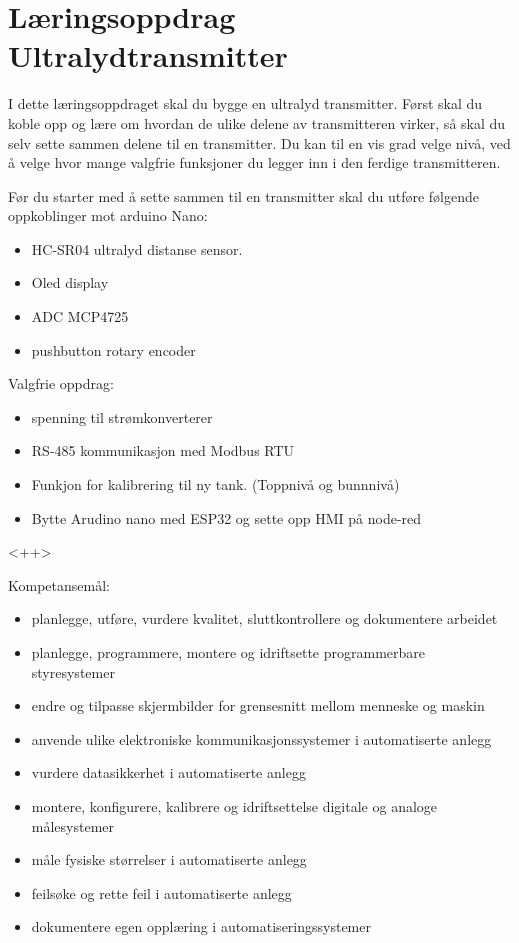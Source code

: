 
\noindent
\section*{Læringsoppdrag Ultralydtransmitter}

\vskip 5pt
I dette læringsoppdraget skal du bygge en ultralyd transmitter. Først skal du koble opp og lære om hvordan de ulike delene av transmitteren virker, så skal du selv sette sammen delene til en transmitter. Du kan til en vis grad velge nivå, ved å velge hvor mange valgfrie funksjoner du legger inn i den ferdige transmitteren. 

Før du  starter med å sette sammen til en transmitter skal du utføre følgende oppkoblinger mot arduino Nano:
\begin{itemize}[noitemsep]
	\item HC-SR04 ultralyd distanse sensor. 
	\item Oled display
	\item ADC MCP4725
	\item pushbutton rotary encoder
\end{itemize}

\vskip 5pt 
Valgfrie oppdrag:

\vskip 5pt 
\begin{itemize}[noitemsep]
	\item spenning til strømkonverterer
	\item RS-485 kommunikasjon med Modbus RTU
	\item Funkjon for kalibrering til ny  tank. (Toppnivå og bunnnivå)
	\item Bytte Arudino nano med ESP32 og sette opp HMI på node-red
\end{itemize}

<++>

\vskip 2.5pt 
Kompetansemål:
\begin{itemize}[noitemsep]

	\item planlegge, utføre, vurdere kvalitet, sluttkontrollere og dokumentere arbeidet
	\item planlegge, programmere, montere og idriftsette programmerbare styresystemer
	\item endre og tilpasse skjermbilder for grensesnitt mellom menneske og maskin
	\item anvende ulike elektroniske kommunikasjonssystemer i automatiserte anlegg
	\item vurdere datasikkerhet i automatiserte anlegg
	\item montere, konfigurere, kalibrere og idriftsettelse digitale og analoge målesystemer
	\item måle fysiske størrelser i automatiserte anlegg
	\item feilsøke og rette feil i automatiserte anlegg
	\item dokumentere egen opplæring i automatiseringssystemer
\end{itemize}

